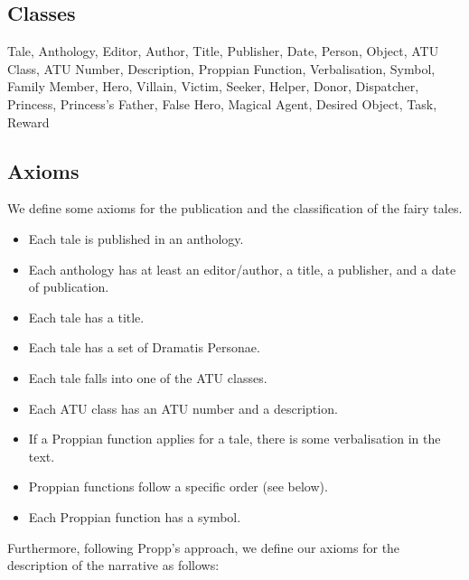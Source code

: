 \documentclass[10pt,a4paper]{article}
\begin{document}
	\subsection{Classes}
	\small 
Tale, Anthology, Editor, Author, Title, Publisher, Date, Person, Object, ATU Class, ATU Number, Description, Proppian Function, Verbalisation, Symbol, Family Member, Hero, Villain, Victim, Seeker, Helper, Donor, Dispatcher, Princess, Princess's Father, False Hero, Magical Agent, Desired Object, Task, Reward 

	\subsection{Axioms}
	
We define some axioms for the publication and the classification of the fairy tales. 
	\small 

\begin{itemize}
		\item Each tale is published in an anthology. 
		\item Each anthology has at least an editor/author, a title, a publisher, and a date of publication.
		\item Each tale has a title. 
		\item Each tale has a set of Dramatis Personae. 
		\item Each tale falls into one of the ATU classes. 
		\item Each ATU class has an ATU number and a description. 
		\item If a Proppian function applies for a tale, there is some verbalisation in the text. 
		\item Proppian functions follow a specific order (see below).
		\item Each Proppian function has a symbol.
\end{itemize}
		
Furthermore, following Propp's approach, we define our axioms for the description of the narrative as follows: 
\end{document}
